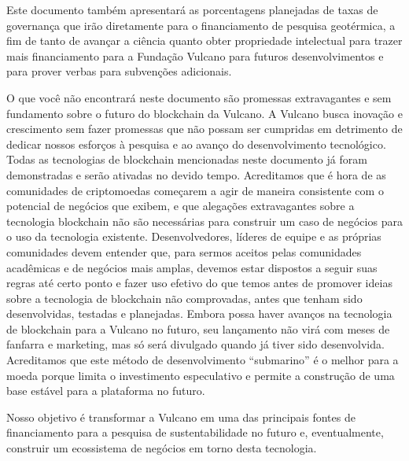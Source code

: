 \documentclass[A4paper, 12pt]{article}
\begin{document}
Este documento também apresentará as porcentagens planejadas de taxas de governança que irão diretamente para o financiamento de pesquisa geotérmica, a fim de tanto de avançar a ciência quanto obter propriedade intelectual para trazer mais financiamento para a Fundação Vulcano para futuros desenvolvimentos e para prover verbas para subvenções adicionais.

O que você não encontrará neste documento são promessas extravagantes e sem fundamento sobre o futuro do blockchain da Vulcano.  A Vulcano busca inovação e crescimento sem fazer promessas que não possam ser cumpridas em detrimento de dedicar nossos esforços à pesquisa e ao avanço do desenvolvimento tecnológico.  Todas as tecnologias de blockchain mencionadas neste documento já foram demonstradas e serão ativadas no devido tempo.  Acreditamos que é hora de as comunidades de criptomoedas começarem a agir de maneira consistente com o potencial de negócios que exibem, e que alegações extravagantes sobre a tecnologia blockchain não são necessárias para construir um caso de negócios para o uso da tecnologia existente. Desenvolvedores, líderes de equipe e as próprias comunidades devem entender que, para sermos aceitos pelas comunidades acadêmicas e de negócios mais amplas, devemos estar dispostos a seguir suas regras até certo ponto e fazer uso efetivo do que temos antes de promover ideias sobre a tecnologia de blockchain não comprovadas, antes que tenham sido desenvolvidas, testadas e planejadas. Embora possa haver avanços na tecnologia de blockchain para a Vulcano no futuro, seu lançamento não virá com meses de fanfarra e marketing, mas só será divulgado quando já tiver sido desenvolvida. Acreditamos que este método de desenvolvimento “submarino” é o melhor para a moeda porque limita o investimento especulativo e permite a construção de uma base estável para a plataforma no futuro.

Nosso objetivo é transformar a Vulcano em uma das principais fontes de financiamento para a pesquisa de sustentabilidade no futuro e, eventualmente, construir um ecossistema de negócios em torno desta tecnologia.
\end{document}
